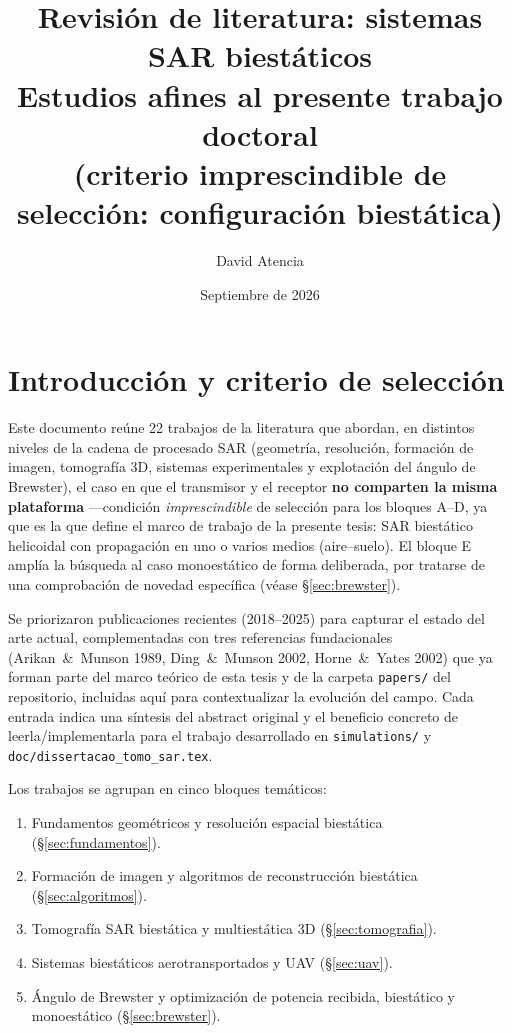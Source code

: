 \documentclass[11pt,a4paper]{article}
\title{\bfseries Revisión de literatura: sistemas SAR biestáticos\\
\large Estudios afines al presente trabajo doctoral\\
(criterio imprescindible de selección: configuración biestática)}
\author{David Atencia}
\date{Septiembre de 2026}
\begin{document}
\maketitle

\section{Introducción y criterio de selección}

Este documento reúne 22 trabajos de la literatura que abordan, en distintos
niveles de la cadena de procesado SAR (geometría, resolución, formación de
imagen, tomografía 3D, sistemas experimentales y explotación del ángulo de
Brewster), el caso en que el transmisor y el receptor \textbf{no comparten
la misma plataforma} —condición \emph{imprescindible} de selección para los
bloques A--D, ya que es la que define el marco de trabajo de la presente
tesis: SAR biestático helicoidal con propagación en uno o varios medios
(aire--suelo). El bloque E amplía la búsqueda al caso monoestático de forma
deliberada, por tratarse de una comprobación de novedad específica (véase
\S\ref{sec:brewster}).

Se priorizaron publicaciones recientes (2018--2025) para capturar el estado
del arte actual, complementadas con tres referencias fundacionales
(Arikan~\&~Munson 1989, Ding~\&~Munson 2002, Horne~\&~Yates 2002) que ya
forman parte del marco teórico de esta tesis y de la carpeta
\texttt{papers/} del repositorio, incluidas aquí para contextualizar la
evolución del campo. Cada entrada indica una síntesis del abstract original
y el beneficio concreto de leerla/implementarla para el trabajo desarrollado
en \texttt{simulations/} y \texttt{doc/dissertacao\_tomo\_sar.tex}.

Los trabajos se agrupan en cinco bloques temáticos:
\begin{enumerate}[itemsep=2pt]
  \item Fundamentos geométricos y resolución espacial biestática (\S\ref{sec:fundamentos}).
  \item Formación de imagen y algoritmos de reconstrucción biestática (\S\ref{sec:algoritmos}).
  \item Tomografía SAR biestática y multiestática 3D (\S\ref{sec:tomografia}).
  \item Sistemas biestáticos aerotransportados y UAV (\S\ref{sec:uav}).
  \item Ángulo de Brewster y optimización de potencia recibida, biestático y monoestático (\S\ref{sec:brewster}).
\end{enumerate}
\end{document}
